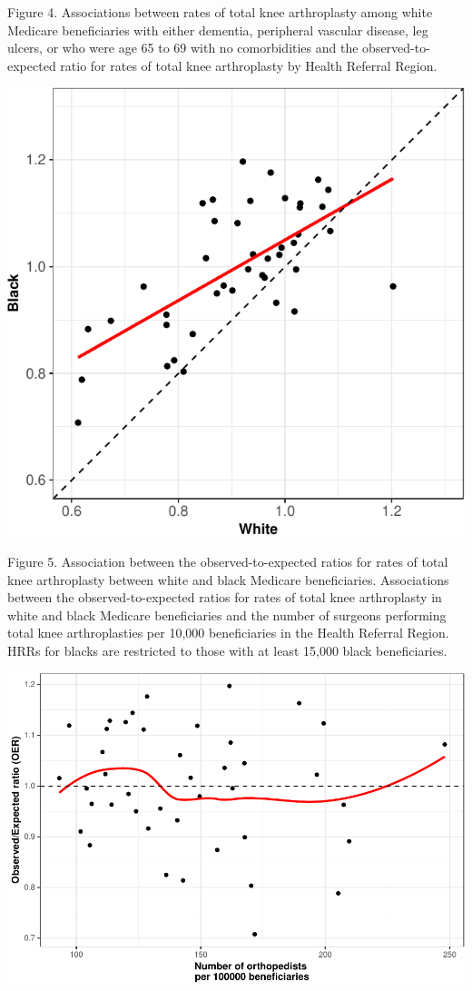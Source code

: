 \documentclass[]{article}
\begin{document}
Figure 4. Associations between rates of total knee arthroplasty among
white Medicare beneficiaries with either dementia, peripheral vascular
disease, leg ulcers, or who were age 65 to 69 with no comorbidities and
the observed-to-expected ratio for rates of total knee arthroplasty by
Health Referral Region.

\includegraphics{Results_files/figure-latex/Results-8-1.pdf}

Figure 5. Association between the observed-to-expected ratios for rates
of total knee arthroplasty between white and black Medicare
beneficiaries. Associations between the observed-to-expected ratios for
rates of total knee arthroplasty in white and black Medicare
beneficiaries and the number of surgeons performing total knee
arthroplasties per 10,000 beneficiaries in the Health Referral Region.
HRRs for blacks are restricted to those with at least 15,000 black
beneficiaries.

\includegraphics{Results_files/figure-latex/unnamed-chunk-1-1.pdf}
\end{document}
